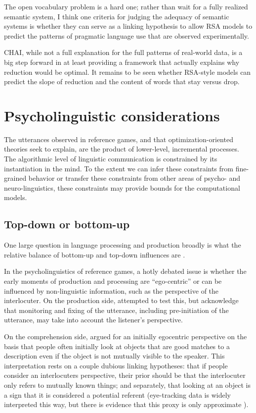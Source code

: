 \documentclass[]{article}
\begin{document}
The open vocabulary problem is a hard one; rather than wait for a fully realized semantic system, I think one criteria for judging the adequacy of semantic systems is whether they can serve as a linking hypothesis to allow RSA models to predict the patterns of pragmatic language use that are observed experimentally. 

CHAI, while not a full explanation for the full patterns of real-world data, is a big step forward in at least providing a framework that actually explains why reduction would be optimal. It remains to be seen whether RSA-style models can predict the slope of reduction and the content of words that stay versus drop. 

\section{Psycholinguistic considerations}


The utterances observed in reference games, and that optimization-oriented theories seek to explain, are the product of lower-level, incremental processes. The algorithmic level of linguistic communication is constrained by its instantiation in the mind. To the extent we can infer these constraints from fine-grained behavior or transfer these constraints from other areas of psycho- and neuro-linguistics, these constraints may provide bounds for the computational models. 

\subsection{Top-down or bottom-up}
One large question in language processing and production broadly is what the relative balance of bottom-up and top-down influences are \citep{TODO}. 

In the psycholinguistics of reference games, a hotly debated issue is whether the early moments of production and processing are ``ego-centric'' or can be influenced by non-linguistic information, such as the perspective of the interlocuter. On the production side, \citet{horton1996} attempted to test this, but acknowledge that monitoring and fixing of the utterance, including pre-initiation of the utterance, may take into account the listener's perspective. %

On the comprehension side, \citet{keysar2000} argued for an initially egocentric perspective on the basis that people often initially look at objects that are good matches to a description even if the object is not mutually visible to the speaker. This interpretation rests on a couple dubious linking hypotheses: that if people consider an interlocuters perspective, their prior should be that the interlocuter only refers to mutually known things;  and separately, that looking at an object is a sign that it is considered a potential referent (eye-tracking data is widely interpreted this way, but there is evidence that this proxy is only approximate \citet{TODO}).
\end{document}
